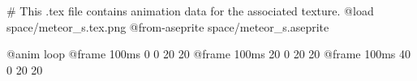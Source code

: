 # This .tex file contains animation data for the associated texture.
@load space/meteor_s.tex.png
@from-aseprite space/meteor_s.aseprite

@anim loop
	@frame 100ms 0 0 20 20
	@frame 100ms 20 0 20 20
	@frame 100ms 40 0 20 20
